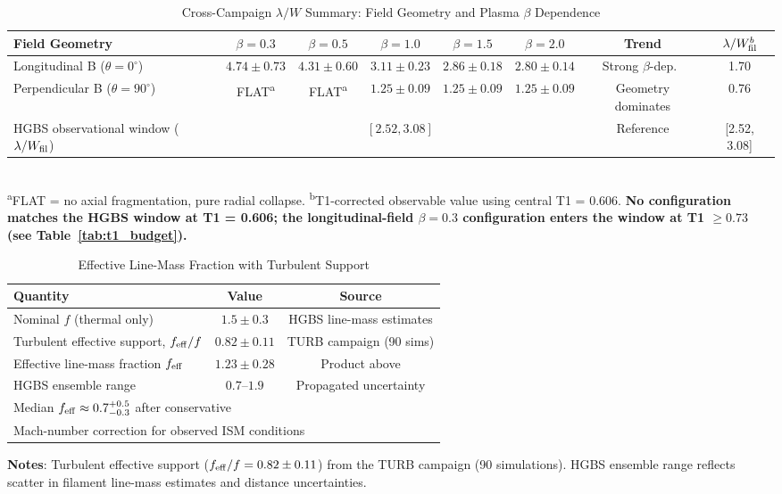 \documentclass[twoside,twocolumn]{mnras}
\begin{document}
\begin{table}
\caption{Cross-Campaign $\lambda/W$ Summary: Field Geometry and Plasma $\beta$ Dependence}
\label{tab:cross_campaign}
\small
\begin{tabular}{lccccccc}
\toprule
Field Geometry & $\beta = 0.3$ & $\beta = 0.5$ & $\beta = 1.0$ & $\beta = 1.5$ & $\beta = 2.0$ & Trend & $\lambda/W_{\rm fil}^{b}$ \\
\midrule
Longitudinal B ($\theta = 0^\circ$) & $4.74 \pm 0.73$ & $4.31 \pm 0.60$ & $3.11 \pm 0.23$ & $2.86 \pm 0.18$ & $2.80 \pm 0.14$ & Strong $\beta$-dep.\ & 1.70 \\
Perpendicular B ($\theta = 90^\circ$) & FLAT\textsuperscript{a} & FLAT\textsuperscript{a} & $1.25 \pm 0.09$ & $1.25 \pm 0.09$ & $1.25 \pm 0.09$ & Geometry dominates & 0.76 \\
\midrule
HGBS observational window ($\lambda/W_{\rm fil}$) & \multicolumn{5}{c}{$[2.52, 3.08]$} & Reference & [2.52, 3.08] \\
\bottomrule
\end{tabular}
\\[2pt]
\footnotesize
\textsuperscript{a}FLAT = no axial fragmentation, pure radial collapse. \hspace{1em}
\textsuperscript{b}T1-corrected observable value using central T1 = 0.606. \textbf{No configuration matches the HGBS window at T1 = 0.606; the longitudinal-field $\beta=0.3$ configuration enters the window at T1 $\geq 0.73$ (see Table~\ref{tab:t1_budget}).}
\end{table}

\begin{table}
\caption{Effective Line-Mass Fraction with Turbulent Support}
\label{tab:feff}
\small
\begin{tabular}{lcc}
\toprule
Quantity & Value & Source \\
\midrule
Nominal $f$ (thermal only) & $1.5 \pm 0.3$ & HGBS line-mass estimates \\
Turbulent effective support, $f_{\rm eff}/f$ & $0.82 \pm 0.11$ & TURB campaign (90 sims) \\
Effective line-mass fraction $f_{\rm eff}$ & $1.23 \pm 0.28$ & Product above \\
HGBS ensemble range & $0.7$--$1.9$ & Propagated uncertainty \\
\midrule
\multicolumn{3}{l}{\footnotesize Median $f_{\rm eff} \approx 0.7^{+0.5}_{-0.3}$ after conservative}\\
\multicolumn{3}{l}{\footnotesize Mach-number correction for observed ISM conditions}\\
\bottomrule
\end{tabular}
\vspace{0.05in}
\footnotesize
\textbf{Notes}: Turbulent effective support ($f_{\rm eff}/f = 0.82 \pm 0.11$) from the
TURB campaign (90 simulations). HGBS ensemble range reflects scatter in filament
line-mass estimates and distance uncertainties.
\end{table}
\end{document}
